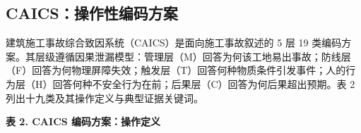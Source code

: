 \documentclass[11pt]{article}
\begin{document}
\subsection{CAICS{\cjkfont ：\allowbreak 操\allowbreak 作\allowbreak 性\allowbreak 编\allowbreak 码\allowbreak 方\allowbreak 案}}
{\cjkfont 建\allowbreak 筑\allowbreak 施\allowbreak 工\allowbreak 事\allowbreak 故\allowbreak 综\allowbreak 合\allowbreak 致\allowbreak 因\allowbreak 系\allowbreak 统\allowbreak （}CAICS{\cjkfont ）\allowbreak 是\allowbreak 面\allowbreak 向\allowbreak 施\allowbreak 工\allowbreak 事\allowbreak 故\allowbreak 叙\allowbreak 述\allowbreak 的} 5 {\cjkfont 层} 19 {\cjkfont 类\allowbreak 编\allowbreak 码\allowbreak 方\allowbreak 案\allowbreak 。\allowbreak 其\allowbreak 层\allowbreak 级\allowbreak 遵\allowbreak 循\allowbreak 因\allowbreak 果\allowbreak 泄\allowbreak 漏\allowbreak 模\allowbreak 型\allowbreak ：\allowbreak 管\allowbreak 理\allowbreak 层\allowbreak （}M{\cjkfont ）\allowbreak 回\allowbreak 答\allowbreak 为\allowbreak 何\allowbreak 该\allowbreak 工\allowbreak 地\allowbreak 易\allowbreak 出\allowbreak 事\allowbreak 故\allowbreak ；\allowbreak 防\allowbreak 线\allowbreak 层\allowbreak （}F{\cjkfont ）\allowbreak 回\allowbreak 答\allowbreak 为\allowbreak 何\allowbreak 物\allowbreak 理\allowbreak 屏\allowbreak 障\allowbreak 失\allowbreak 效\allowbreak ；\allowbreak 触\allowbreak 发\allowbreak 层\allowbreak （}T{\cjkfont ）\allowbreak 回\allowbreak 答\allowbreak 何\allowbreak 种\allowbreak 物\allowbreak 质\allowbreak 条\allowbreak 件\allowbreak 引\allowbreak 发\allowbreak 事\allowbreak 件\allowbreak ；\allowbreak 人\allowbreak 的\allowbreak 行\allowbreak 为\allowbreak 层\allowbreak （}H{\cjkfont ）\allowbreak 回\allowbreak 答\allowbreak 何\allowbreak 种\allowbreak 不\allowbreak 安\allowbreak 全\allowbreak 行\allowbreak 为\allowbreak 在\allowbreak 前\allowbreak ；\allowbreak 后\allowbreak 果\allowbreak 层\allowbreak （}C{\cjkfont ）\allowbreak 回\allowbreak 答\allowbreak 为\allowbreak 何\allowbreak 后\allowbreak 果\allowbreak 超\allowbreak 出\allowbreak 预\allowbreak 期\allowbreak 。\allowbreak 表} 2 {\cjkfont 列\allowbreak 出\allowbreak 十\allowbreak 九\allowbreak 类\allowbreak 及\allowbreak 其\allowbreak 操\allowbreak 作\allowbreak 定\allowbreak 义\allowbreak 与\allowbreak 典\allowbreak 型\allowbreak 证\allowbreak 据\allowbreak 关\allowbreak 键\allowbreak 词\allowbreak 。}

\textbf{{\cjkfont 表} 2. CAICS {\cjkfont 编\allowbreak 码\allowbreak 方\allowbreak 案\allowbreak ：\allowbreak 操\allowbreak 作\allowbreak 定\allowbreak 义}}
\end{document}
